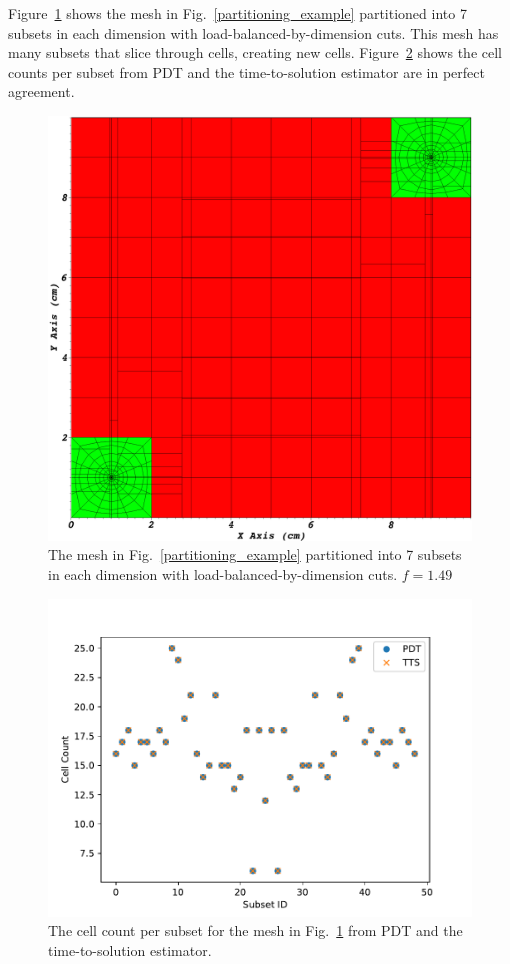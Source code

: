 \documentclass[times,final]{elsarticle}
\begin{document}
Figure~\ref{ubp_7x7} shows the mesh in Fig.~\ref{partitioning_example} partitioned into 7 subsets in each dimension with load-balanced-by-dimension cuts. This mesh has many subsets that slice through cells, creating new cells. Figure~\ref{cell_comp} shows the cell counts per subset from PDT and the time-to-solution estimator are in perfect agreement.
\begin{figure}[H]
\centering
\includegraphics[scale=0.15]{../figures/spiderweb_7x7_lbd.png}
\caption{The mesh in Fig.~\ref{partitioning_example} partitioned into 7 subsets in each dimension with load-balanced-by-dimension cuts. $f = 1.49$}
\label{ubp_7x7}
\end{figure}
\begin{figure}[H]
\centering
\includegraphics[scale=0.75]{../figures/spiderweb_cell_comp_7x7.pdf}
\caption{The cell count per subset for the mesh in Fig.~\ref{ubp_7x7} from PDT and the time-to-solution estimator.}
\label{cell_comp}
\end{figure}
\end{document}
